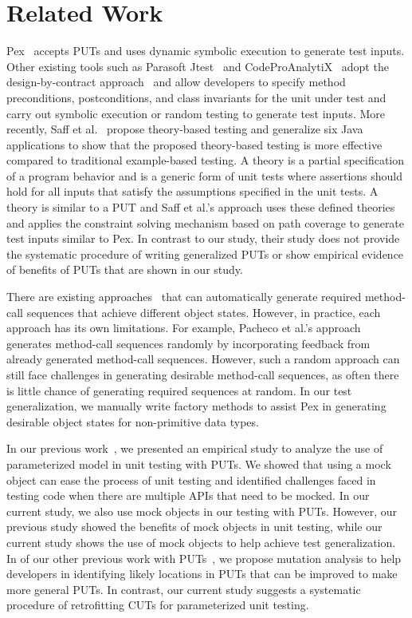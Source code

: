 \section{Related Work}
\label{sec:related}
\vspace*{2ex}
Pex~\cite{tillmann08:pex, tillmann05:parameterized, tillmann06:unit} accepts PUTs and uses dynamic symbolic execution to generate test inputs. Other existing tools such as Parasoft Jtest~\cite{jtest} and CodeProAnalytiX~\cite{codepro} adopt the design-by-contract approach~\cite{dbc} and allow developers to specify method preconditions, postconditions, and class invariants for the unit under test and carry out symbolic execution or random testing to generate test inputs. More recently, Saff et al.~\cite{ernst:theory} propose theory-based testing and generalize six Java applications to show that the proposed theory-based testing is more effective compared to traditional example-based testing. A theory is a partial specification of a program behavior and is a generic form of unit tests where assertions should hold for all inputs that satisfy the assumptions specified in the unit tests. A theory is similar to a PUT and Saff et al.'s approach uses these defined theories and applies the constraint solving mechanism based on path coverage to generate test inputs similar to Pex. In contrast to our study, their study does not provide the systematic procedure of writing generalized PUTs or show empirical evidence of benefits of PUTs that are shown in our study. 

There are existing approaches~\cite{pacheco:feedback, csallner:jcrasher, khurshid:symbolic} that can automatically generate required method-call sequences that achieve different object states. However, in practice, each approach has its own limitations. For example, Pacheco et al.'s approach~\cite{pacheco:feedback} generates method-call sequences randomly by incorporating feedback from already generated method-call sequences. However, such a random approach can still face challenges in generating desirable method-call sequences, as often there is little chance of generating required sequences at random. In our test generalization, we manually write factory methods to assist Pex in generating desirable object states for non-primitive data types.

In our previous work~\cite{marri09:empirical}, we presented an empirical study to analyze the use of parameterized model in unit testing with PUTs. We showed that using a mock object can ease the process of unit testing and identified challenges faced in testing code when there are multiple APIs that need to be mocked. In our current study, we also use mock objects in our testing with PUTs. However, our previous study showed the benefits of mock objects in unit testing, while our current study shows the use of mock objects to help achieve test generalization. In of our other previous work with PUTs~\cite{xie09:mutation}, we propose mutation analysis to help developers in identifying likely locations in PUTs that can be improved to make more general PUTs. In contrast, our current study suggests a systematic procedure of retrofitting CUTs for parameterized unit testing.